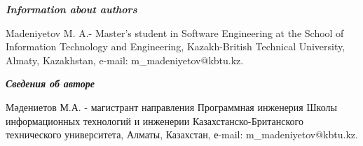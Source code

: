 \begin{authorinfo}
\emph{{\bfseries Information about authors}}

Madeniyetov M. A.- Master's student in Software Engineering at the
School of Information Technology and Engineering, Kazakh-British
Technical University, Almaty, Kazakhstan, e-mail:
m\_madeniyetov@kbtu.kz.

\emph{{\bfseries Сведения об авторе}}

Мәдениетов М.А. - магистрант направления Программная инженерия Школы
информационных технологий и инженерии Казахстанско-Британского
технического университета, Алматы, Казахстан, е-mail:
m\_madeniyetov@kbtu.kz.
\end{authorinfo}
